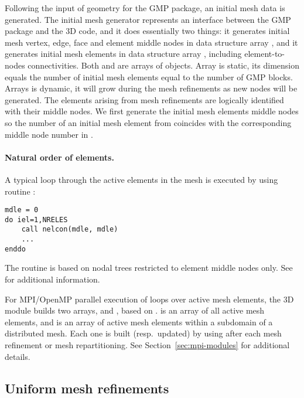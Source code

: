 Following the input of geometry for the GMP package, an initial mesh data is generated. The initial mesh generator represents an interface between the GMP package and the \hp3D code, and it does essentially  two things: it generates initial mesh vertex, edge, face and element middle nodes in data structure array , and it generates initial mesh elements in data structure array , including element-to-nodes connectivities. Both  and  are arrays of objects. Array  is static, its dimension equals the number of initial mesh elements equal to the number of GMP blocks. Arrays  is dynamic, it will grow during the mesh refinements as new nodes will be generated. The elements arising from mesh refinements are logically identified with their middle nodes. We first generate the initial mesh elements middle nodes so the number of an initial mesh element from  coincides with the corresponding middle node number in .

\paragraph{Natural order of elements.}

A typical loop through the active elements in the mesh is executed by using routine :

\begin{lstlisting}[caption=Loop over active mesh elements., label={lst:loop_active_mesh_elements}]
mdle = 0
do iel=1,NRELES
	call nelcon(mdle, mdle)
	...
enddo
\end{lstlisting}

The  routine is based on nodal trees restricted to element middle nodes only. See \cite{hpbook,hpbook2} for additional information.

\begin{remark}
For MPI/OpenMP parallel execution of loops over active mesh elements, the \hp3D  module builds two arrays,  and , based on .  is an array of all active mesh elements, and  is an array of active mesh elements within a subdomain of a distributed mesh. Each one is built (resp.\ updated) by using  after each mesh refinement or mesh repartitioning. See Section~\ref{sec:mpi-modules} for additional details.
\end{remark}

\subsection{Uniform mesh refinements}
\label{subsec:uniform-refinements}

